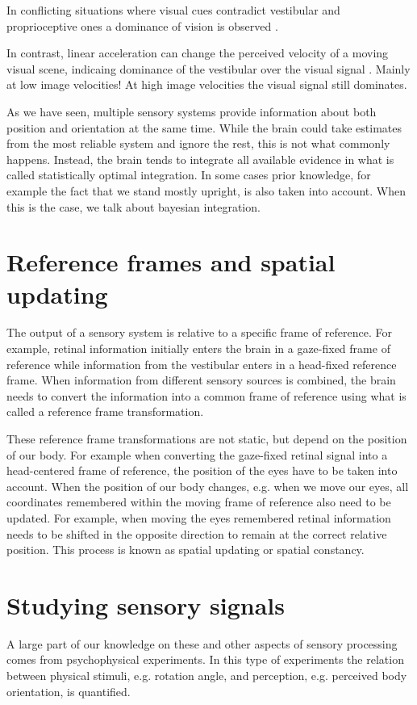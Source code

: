 In conflicting situations where visual cues contradict vestibular and proprioceptive ones a dominance of vision is observed \cite{berthoz1975}.

In contrast, linear acceleration can change the perceived velocity of a moving visual scene, indicaing dominance of the vestibular over the visual signal \cite{pavard1977}. Mainly at low image velocities! At high image velocities the visual signal still dominates.

As we have seen, multiple sensory systems provide information about both position and orientation at the same time. While the brain could take estimates from the most reliable system and ignore the rest, this is not what commonly happens.
Instead, the brain tends to integrate all available evidence in what is called statistically optimal integration. In some cases prior knowledge, for example the fact that we stand mostly upright, is also taken into account. When this is the case, we talk about bayesian integration.


\section{Reference frames and spatial updating}
The output of a sensory system is relative to a specific frame of reference. For example, retinal information initially enters the brain in a gaze-fixed frame of reference while information from the vestibular enters in a head-fixed reference frame. When information from different sensory sources is combined, the brain needs to convert the information into a common frame of reference using what is called a reference frame transformation.

These reference frame transformations are not static, but depend on the position of our body. For example when converting the gaze-fixed retinal signal into a head-centered frame of reference, the position of the eyes have to be taken into account. When the position of our body changes, e.g. when we move our eyes, all coordinates remembered within the moving frame of reference also need to be updated. For example, when moving the eyes remembered retinal information needs to be shifted in the opposite direction to remain at the correct relative position. This process is known as spatial updating or spatial constancy.

\section{Studying sensory signals}
A large part of  our knowledge on these and other aspects of sensory processing comes from psychophysical experiments. In this type of experiments the relation between physical stimuli, e.g. rotation angle, and perception, e.g. perceived body orientation, is quantified.

